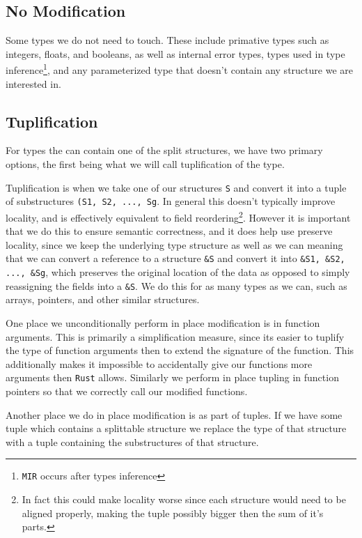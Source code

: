 \documentclass[12pt,oneside]{book}
\newcommand{\rustname}{{\texttt{Rust}}}
\def \rust {\rustname{}\xspace}
\newcommand{\mirname}{{\texttt{MIR}}}
\def \mir {\mirname{}\xspace}
\begin{document}
\subsection{No Modification}
Some types we do not need to touch. These include primative types such as
integers, floats, and booleans, as well as internal error types, types used in
type inference\footnote{\mir occurs after types inference}, and any
parameterized type that doesn't contain any structure we are interested in.

\subsection{Tuplification}
For types the can contain one of the split structures, we have two primary
options, the first being what we will call tuplification of the type.

Tuplification is when we take one of our structures \texttt{S} and convert it
into a tuple of substructures \texttt{(S1, S2, ..., Sg}. In general this 
doesn't typically improve locality, and is effectively equivalent to 
field reordering\footnote{In fact this could make locality worse since each
structure would need to be aligned properly, making the tuple possibly
bigger then the sum of it's parts.}. However it is important that we do this to
ensure semantic correctness, and it does help use preserve locality,
since we keep the underlying type structure as well as we can meaning that
we can convert a reference to a structure \texttt{\&S} and convert it into 
\texttt{\&S1, \&S2, ..., \&Sg}, which preserves the original location of the 
data as opposed to simply reassigning the fields into a \texttt{\&S}. We do 
this for as many types as we can, such as arrays, pointers, and other similar
structures.

One place we unconditionally perform in place modification is in function
arguments. This is primarily a simplification measure, since its easier to
tuplify the type of function arguments then to extend the signature of the
function. This additionally makes it impossible to accidentally 
give our functions more
arguments then \rust allows.
Similarly we perform in place tupling in function pointers so that we correctly
call our modified functions.

Another place we do in place modification is as part of tuples. If we have some
tuple which contains a splittable structure we replace the type of that
structure with a tuple containing the substructures of that structure.
\end{document}

